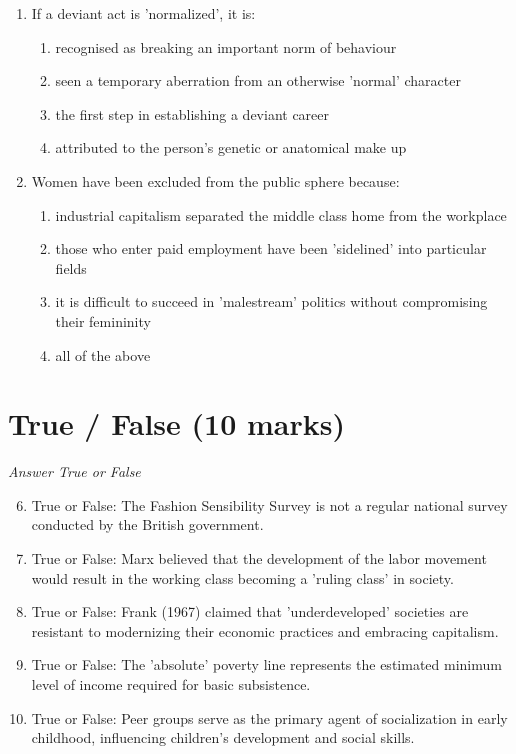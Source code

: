 \documentclass[12pt]{article}
\begin{document}
\begin{enumerate}[label=\arabic*.]
\item If a deviant act is 'normalized', it is:
\begin{enumerate}[label=(\alph*)]
    \item recognised as breaking an important norm of behaviour
    \item seen a temporary aberration from an otherwise 'normal' character
    \item the first step in establishing a deviant career
    \item attributed to the person's genetic or anatomical make up
\end{enumerate}
\item Women have been excluded from the public sphere because:
\begin{enumerate}[label=(\alph*)]
    \item industrial capitalism separated the middle class home from the workplace
    \item those who enter paid employment have been 'sidelined' into particular fields
    \item it is difficult to succeed in 'malestream' politics without compromising their femininity
    \item all of the above
\end{enumerate}
\end{enumerate}

\section*{True / False (10 marks)}
\textit{Answer True or False}
\begin{enumerate}[label=\arabic*.]
\setcounter{enumi}{5}
\item True or False: The Fashion Sensibility Survey is not a regular national survey conducted by the British government.
\item True or False: Marx believed that the development of the labor movement would result in the working class becoming a 'ruling class' in society.
\item True or False: Frank (1967) claimed that 'underdeveloped' societies are resistant to modernizing their economic practices and embracing capitalism.
\item True or False: The 'absolute' poverty line represents the estimated minimum level of income required for basic subsistence.
\item True or False: Peer groups serve as the primary agent of socialization in early childhood, influencing children's development and social skills.
\end{enumerate}
\end{document}
